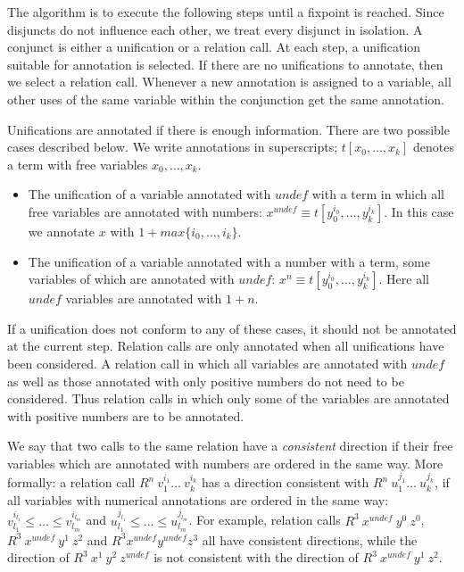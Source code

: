 \documentclass[submission,copyright,creativecommons]{eptcs}
\begin{document}
The algorithm is to execute the following steps until a fixpoint is reached.
Since disjuncts do not influence each other, we treat every disjunct in isolation.
A conjunct is either a unification or a relation call.
At each step, a unification suitable for annotation is selected.
If there are no unifications to annotate, then we select a relation call.
Whenever a new annotation is assigned to a variable, all other uses of the same variable within the conjunction get the same annotation.

Unifications are annotated if there is enough information.
There are two possible cases described below.
We write annotations in superscripts; $t[x_0, \dots, x_k]$ denotes a term with free variables $x_0, \dots, x_k$.
\begin{itemize}
  \item The unification of a variable annotated with $undef$ with a term in which all free variables are annotated with numbers: $x^{undef} \equiv t[y_0^{i_0},\dots, y_k^{i_k}]$. In this case we annotate $x$ with $1+max\{i_0,\dots,i_k\}$.
  \item The unification of a variable annotated with a number with a term, some variables of which are annotated with $undef$: $x^{n} \equiv t[y_0^{i_0},\dots, y_k^{i_k}]$. Here all $undef$ variables are annotated with $1+n$.
\end{itemize}

If a unification does not conform to any of these cases, it should not be annotated at the current step.
Relation calls are only annotated when all unifications have been considered.
A relation call in which all variables are annotated with $undef$ as well as those annotated with only positive numbers do not need to be considered.
Thus relation calls in which only some of the variables are annotated with positive numbers are to be annotated.

We say that two calls to the same relation have a \emph{consistent} direction if their free variables which are annotated with numbers are ordered in the same way.
More formally: a relation call $R^n \ v_1^{i_1} \dots \ v_k^{i_k}$ has a direction consistent with $R^n \ u_1^{j_1} \dots \ u_k^{j_k}$, if all variables with numerical annotations are ordered in the same way: $v_{l_1}^{i_{l_1}} \leq \dots \leq v_{l_m}^{i_{l_m}}$ and $u_{l_1}^{j_{l_1}} \leq \dots \leq u_{l_m}^{j_{l_m}}$. For example, relation calls $R^3 \ x^{undef} \ y^{0} \ z^{0}$, $R^3 \ x^{undef} \ y^{1} \ z^{2}$ and $R^3 x^{undef} y^{undef} z^{3}$ all have consistent directions, while the direction of $R^3 \ x^{1} \ y^{2} \ z^{undef}$ is not consistent with the direction of $R^3 \ x^{undef} \ y^{1} \ z^{2}$.
\end{document}
